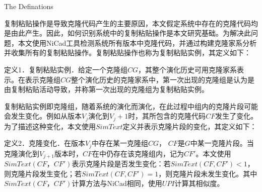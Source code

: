 
{The Definations}

复制粘贴操作是导致克隆代码产生的主要原因，本文假定系统中存在的克隆代码均是由此产生。因此，如何识别系统中的复制粘贴操作是本文研究基础。为解决此问题，本文使用NiCad工具检测系统所有版本中克隆代码，并通过构建克隆家系分析并收集所有的复制粘贴操作。复制粘贴操作也称为复制粘贴实例，其定义如下：


定义1．复制粘贴实例．给定一个克隆组$CG$，其整个演化历史可用克隆家系表示。在表示克隆组$CG$整个演化历史的克隆家系中，第一次出现的克隆组是认为是由复制粘贴活动导致，并称第一次出现的克隆组为复制粘贴实例。


复制粘贴实例即克隆组，随着系统的演化而演化，在此过程中组内的克隆片段可能会发生变化。例如从版本$V_j$演化到$V_j+1$时，其所包含的克隆代码$CF$发生了变化。为了描述这种变化，本文使用$SimText$定义并表示克隆片段的变化，其定义如下：


定义2．克隆变化．在版本$V_j$中存在某一克隆组$CG$， $CF$是$G$中某一克隆片段。当克隆演化到$V_{j+1}$版本时，$CF$在中仍存在该克隆组内，记为$CF'$。本文使用$SimText(CF，CF')$表示克隆片段是否发生变化：若$SimText(CF,CF')<1$，则克隆片段发生变化；若$SimText(CF,CF')=1$，则克隆片段未发生变化。其中$SimText(CF，CF')$计算方法与NiCad相同，使用$UPI$计算其相似度。


